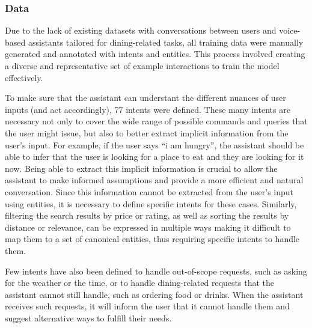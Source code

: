 \documentclass[twocolumn]{article}
\begin{document}
\subsubsection*{Data}

Due to the lack of existing datasets with conversations between users and voice-based assistants tailored for dining-related tasks, all training data were manually generated and annotated with intents and entities. This process involved creating a diverse and representative set of example interactions to train the model effectively.

To make sure that the assistant can understant the different nuances of user inputs (and act accordingly), 77 intents were defined. These many intents are necessary not only to cover the wide range of possible commands and queries that the user might issue, but also to better extract implicit information from the user's input. For example, if the user says ``i am hungry'', the assistant should be able to infer that the user is looking for a place to eat and they are looking for it now. Being able to extract this implicit information is crucial to allow the assistant to make informed assumptions and provide a more efficient and natural conversation. Since this information cannot be extracted from the user's input using entities, it is necessary to define specific intents for these cases. Similarly, filtering the search results by price or rating, as well as sorting the results by distance or relevance, can be expressed in multiple ways making it difficult to map them to a set of canonical entities, thus requiring specific intents to handle them.

Few intents have also been defined to handle out-of-scope requests, such as asking for the weather or the time, or to handle dining-related requests that the assistant cannot still handle, such as ordering food or drinks. When the assistant receives such requests, it will inform the user that it cannot handle them and suggest alternative ways to fulfill their needs.
\end{document}

